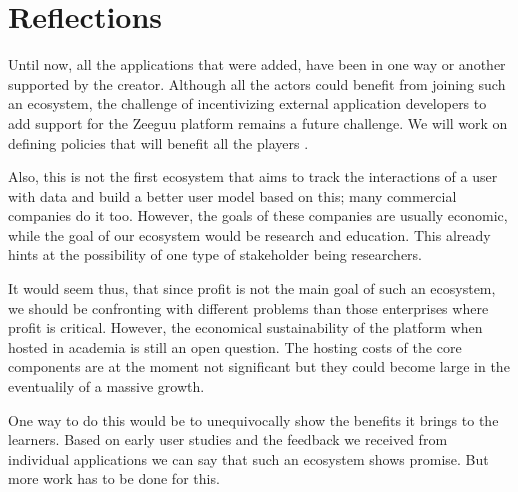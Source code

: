
\section {Reflections}

Until now, all the applications that were added, have been in one way or another supported by the creator. Although all the actors could benefit from joining such an ecosystem,  the challenge of incentivizing external application developers to add support for the Zeeguu platform remains a future challenge. We will work on defining policies that will benefit all the players \cite{Jans09agenda}. 


Also, this is not the first ecosystem that aims to track 
the interactions of a user with data and build a better 
user model based on this; many commercial companies do it too. 
However, the goals of these companies are usually economic, 
while the goal of our ecosystem would be research and education. This already hints at the possibility of one type of stakeholder being researchers.

It would seem thus, that since profit is not the main
goal of such an ecosystem, we should be confronting
with different problems than those enterprises where 
profit is critical. However, the economical 
sustainability of the platform when hosted in academia
is still an open question. The hosting costs of the 
core components are at the moment not significant 
but they could become large in the eventualily of 
a massive growth.


One way to do this would be to unequivocally show 
the benefits it brings to the learners. Based on 
early user studies and the feedback we received 
from individual applications we can say that such
an ecosystem shows promise. But more work has to 
be done for this. 






